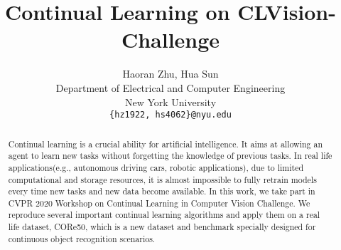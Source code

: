 \documentclass{article}
\title{Continual Learning on CLVision-Challenge}
\author{%
  Haoran Zhu, Hua Sun \\
  Department of Electrical and Computer Engineering\\
  New York University\\
  \texttt{\{hz1922, hs4062\}@nyu.edu} \\
}
\begin{document}

\maketitle

\begin{abstract}
  Continual learning is a crucial ability for artificial intelligence. It aims at allowing an agent to learn new tasks without forgetting the knowledge of previous tasks. In real life applications(e.g., autonomous driving cars, robotic applications), due to limited computational and storage resources, it is almost impossible to fully retrain models every time new tasks and new data become available. In this work, we take part in CVPR 2020 Workshop on Continual Learning in Computer Vision Challenge. We reproduce several important continual learning algorithms and apply them on a real life dataset, CORe50, which is a new dataset and benchmark specially designed for continuous object recognition scenarios.  
\end{abstract}









\end{document}
